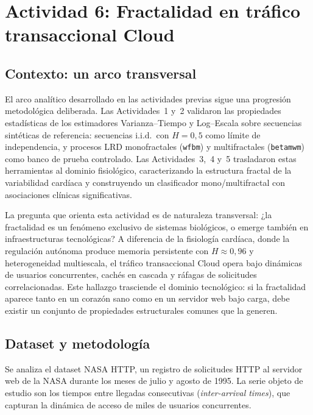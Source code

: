 \newpage
\section{Actividad 6: Fractalidad en tráfico transaccional Cloud}

\subsection{Contexto: un arco transversal}

El arco analítico desarrollado en las actividades previas sigue una progresión
metodológica deliberada. Las Actividades~1 y~2 validaron las propiedades
estadísticas de los estimadores Varianza--Tiempo y Log--Escala sobre secuencias
sintéticas de referencia: secuencias i.i.d.\ con $H=0{,}5$ como límite de
independencia, y procesos LRD monofractales (\texttt{wfbm}) y multifractales
(\texttt{betamwm}) como banco de prueba controlado. Las Actividades~3,~4 y~5
trasladaron estas herramientas al dominio fisiológico, caracterizando la
estructura fractal de la variabilidad cardíaca y construyendo un clasificador
mono/multifractal con asociaciones clínicas significativas.

La pregunta que orienta esta actividad es de naturaleza transversal: ¿la
fractalidad es un fenómeno exclusivo de sistemas biológicos, o emerge también en
infraestructuras tecnológicas? A diferencia de la fisiología cardíaca, donde la
regulación autónoma produce memoria persistente con $H\approx0{,}96$ y
heterogeneidad multiescala, el tráfico transaccional Cloud opera bajo dinámicas
de usuarios concurrentes, cachés en cascada y ráfagas de solicitudes
correlacionadas. Este hallazgo trasciende el dominio tecnológico: si la
fractalidad aparece tanto en un corazón sano como en un servidor web bajo carga,
debe existir un conjunto de propiedades estructurales comunes que la generen.

\subsection{Dataset y metodología}

Se analiza el dataset NASA HTTP, un registro de solicitudes HTTP al servidor web
de la NASA durante los meses de julio y agosto de 1995. La serie objeto de
estudio son los tiempos entre llegadas consecutivas (\textit{inter-arrival
times}), que capturan la dinámica de acceso de miles de usuarios concurrentes.

